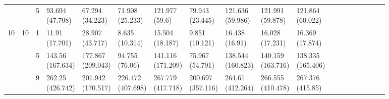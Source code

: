 \documentclass[12pt,a4paper]{article}
\begin{document}
\begin{landscape}
\begin{longtable}{lllllllllllrrrrrrrr}
 &  & 5 & \makecell{93.694 \\ (47.708)} & \makecell{67.294 \\ (34.223)} & \makecell{71.908 \\ (25.233)} & \makecell{121.977 \\ (59.6)} & \makecell{79.943 \\ (23.445)} & \makecell{121.636 \\ (59.986)} & \makecell{121.991 \\ (59.878)} & \makecell{121.864 \\ (60.022)} \\
\cline{1-19} \cline{2-19}
\multirow[t]{9}{*}{10} & \multirow[t]{3}{*}{10} & 1 & \makecell{11.91 \\ (17.701)} & \makecell{28.907 \\ (43.717)} & \makecell{8.635 \\ (10.314)} & \makecell{15.504 \\ (18.187)} & \makecell{9.851 \\ (10.121)} & \makecell{16.438 \\ (16.91)} & \makecell{16.028 \\ (17.231)} & \makecell{16.369 \\ (17.874)}\\
 &  & 5 & \makecell{143.56 \\ (167.634)} & \makecell{177.867 \\ (209.043)} & \makecell{94.755 \\ (76.06)} & \makecell{141.116 \\ (171.209)} & \makecell{75.967 \\ (54.791)} & \makecell{138.544 \\ (160.823)} & \makecell{140.159 \\ (163.716)} & \makecell{138.335 \\ (165.406)} \\
 &  & 9 & \makecell{262.25 \\ (426.742)} & \makecell{201.942 \\ (170.517)} & \makecell{226.472 \\ (407.698)} & \makecell{267.779 \\ (417.718)} & \makecell{200.697 \\ (357.116)} & \makecell{264.61 \\ (412.264)} & \makecell{266.555 \\ (410.478)} & \makecell{267.376 \\ (415.85)} \\
\cline{2-19}

\end{longtable}
\end{landscape}
\end{document}
